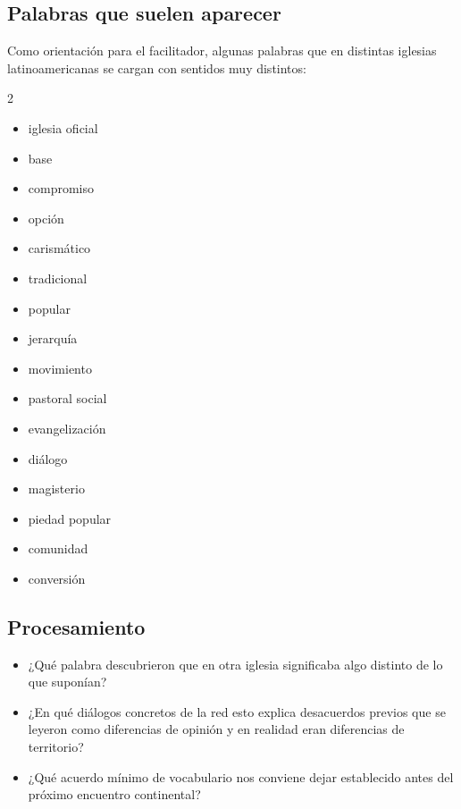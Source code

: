 \documentclass[11pt, a4paper]{article}
\begin{document}
\begin{actividad}
\subsection*{Palabras que suelen aparecer}
Como orientación para el facilitador, algunas palabras que en distintas iglesias latinoamericanas se cargan con sentidos muy distintos:

\begin{multicols}{2}
\begin{itemize}[leftmargin=1.2em]
  \item iglesia oficial
  \item base
  \item compromiso
  \item opción
  \item carismático
  \item tradicional
  \item popular
  \item jerarquía
  \item movimiento
  \item pastoral social
  \item evangelización
  \item diálogo
  \item magisterio
  \item piedad popular
  \item comunidad
  \item conversión
\end{itemize}
\end{multicols}

\subsection*{Procesamiento}
\begin{itemize}
  \item ¿Qué palabra descubrieron que en otra iglesia significaba algo distinto de lo que suponían?
  \item ¿En qué diálogos concretos de la red esto explica desacuerdos previos que se leyeron como diferencias de opinión y en realidad eran diferencias de territorio?
  \item ¿Qué acuerdo mínimo de vocabulario nos conviene dejar establecido antes del próximo encuentro continental?
\end{itemize}


\end{actividad}
\end{document}
